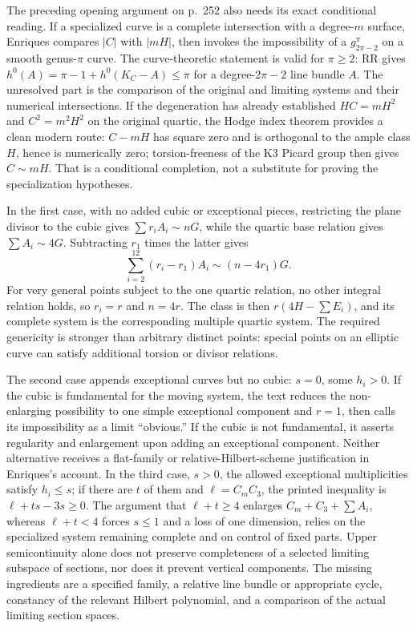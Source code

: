 The preceding opening argument on p.~252 also needs its exact conditional reading. If a specialized curve is a complete intersection with a degree-\(m\) surface, Enriques compares \(\vert C\vert \) with \(\vert mH\vert \), then invokes the impossibility of a \(g^{\pi}_{2\pi-2}\) on a smooth genus-\(\pi\) curve. The curve-theoretic statement is valid for \(\pi\ge2\): RR gives \(h^0(A)=\pi-1+h^0(K_C-A)\le\pi\) for a degree-\(2\pi-2\) line bundle \(A\). The unresolved part is the comparison of the original and limiting systems and their numerical intersections. If the degeneration has already established \(H C=mH^2\) and \(C^2=m^2H^2\) on the original quartic, the Hodge index theorem provides a clean modern route: \(C-mH\) has square zero and is orthogonal to the ample class \(H\), hence is numerically zero; torsion-freeness of the K3 Picard group then gives \(C\sim mH\). That is a conditional completion, not a substitute for proving the specialization hypotheses.

In the first case, with no added cubic or exceptional pieces, restricting the plane divisor to the cubic gives \(\sum r_iA_i\sim nG\), while the quartic base relation gives \(\sum A_i\sim4G\). Subtracting \(r_1\) times the latter gives
\[
\sum_{i=2}^{12}(r_i-r_1)A_i\sim(n-4r_1)G.
\]
For very general points subject to the one quartic relation, no other integral relation holds, so \(r_i=r\) and \(n=4r\). The class is then \(r(4H-\sum E_i)\), and its complete system is the corresponding multiple quartic system. The required genericity is stronger than arbitrary distinct points: special points on an elliptic curve can satisfy additional torsion or divisor relations.

The second case appends exceptional curves but no cubic: \(s=0\), some \(h_i>0\). If the cubic is fundamental for the moving system, the text reduces the non-enlarging possibility to one simple exceptional component and \(r=1\), then calls its impossibility as a limit ``obvious.'' If the cubic is not fundamental, it asserts regularity and enlargement upon adding an exceptional component. Neither alternative receives a flat-family or relative-Hilbert-scheme justification in Enriques's account. In the third case, \(s>0\), the allowed exceptional multiplicities satisfy \(h_i\le s\); if there are \(t\) of them and \(\ell=C_mC_3\), the printed inequality is \(\ell+ts-3s\ge0\). The argument that \(\ell+t\ge4\) enlarges \(C_m+C_3+\sum A_i\), whereas \(\ell+t<4\) forces \(s\le1\) and a loss of one dimension, relies on the specialized system remaining complete and on control of fixed parts. Upper semicontinuity alone does not preserve completeness of a selected limiting subspace of sections, nor does it prevent vertical components. The missing ingredients are a specified family, a relative line bundle or appropriate cycle, constancy of the relevant Hilbert polynomial, and a comparison of the actual limiting section spaces.

